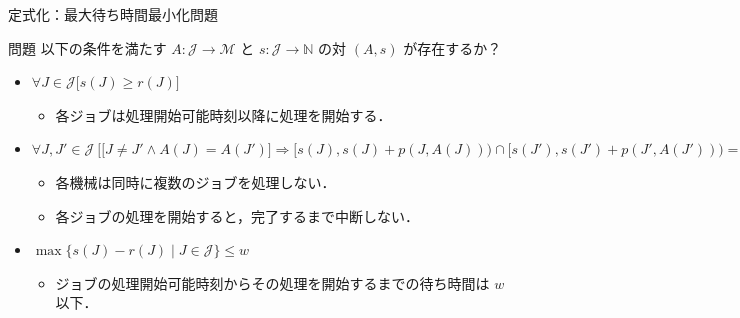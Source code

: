 \documentclass[dvipdfmx]{beamer}
\begin{document}
    \begin{frame}{定式化：最大待ち時間最小化問題}
      \begin{block}{問題}
        以下の条件を満たす $A : \mathcal{J} \to \mathcal{M}$ と $s : \mathcal{J} \to \mathbb{N}$ の対 $(A,s)$ が存在するか？
        \begin{itemize}
          \item {$\forall J \in \mathcal{J}\big[s(J) \ge r(J) \big]$}
          \begin{itemize}
            \item {各ジョブは処理開始可能時刻以降に処理を開始する．}
          \end{itemize}
          \item {$\forall J, J' \in \mathcal{J}\ \Big[ \big[J\ne J' \land A(J) = A(J')\big] \Rightarrow [s(J), s(J)+p(J,A(J))) \cap[s(J'), s(J')+p(J', A(J'))) = \emptyset \Big]$}
          \begin{itemize}
            \item {各機械は同時に複数のジョブを処理しない．}
            \item {各ジョブの処理を開始すると，完了するまで中断しない．}
          \end{itemize}
          \item {$\max\big\{s(J) - r(J) \mid J \in \mathcal{J}\big\} \le w$}
          \begin{itemize}
            \item {ジョブの処理開始可能時刻からその処理を開始するまでの待ち時間は $w$ 以下．}
          \end{itemize}
        \end{itemize}
      \end{block}
    \end{frame}
\end{document}

